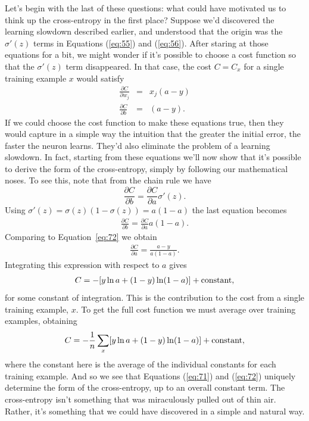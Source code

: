 \documentclass[a4paper,twoside,10pt]{book}
\begin{document}
Let's begin with the last of these questions: what could have motivated us to think up the cross-entropy in the first place? Suppose we'd discovered the learning slowdown described earlier, and understood that the origin was the $\sigma'(z)$ terms in Equations (\ref{eq:55}) and (\ref{eq:56}). After staring at those equations for a bit, we might wonder if it's possible to choose a cost function so that the $\sigma'(z)$ term disappeared. In that case, the cost $C=C_x$ for a single training example $x$ would satisfy
\begin{eqnarray} 
\frac{\partial C}{\partial w_j} & = & x_j(a-y) \label{eq:71}\\
\frac{\partial C}{\partial b } & = & (a-y).
\label{eq:72}\end{eqnarray}
If we could choose the cost function to make these equations true, then they would capture in a simple way the intuition that the greater the initial error, the faster the neuron learns. They'd also eliminate the problem of a learning slowdown. In fact, starting from these equations we'll now show that it's possible to derive the form of the cross-entropy, simply by following our mathematical noses. To see this, note that from the chain rule we have
\begin{equation}
	\frac{\partial C}{\partial b} = \frac{\partial C}{\partial a} \sigma'(z).
	\label{eq:73}
\end{equation}
Using $\sigma'(z)=\sigma(z)(1-\sigma(z))=a(1-a)$ the last equation becomes
\begin{eqnarray}
\frac{\partial C}{\partial b} = \frac{\partial C}{\partial a} 
a(1-a).
\label{eq:74}\end{eqnarray}
Comparing to Equation~\ref{eq:72} we obtain
\begin{eqnarray}
\frac{\partial C}{\partial a} = \frac{a-y}{a(1-a)}. \label{eq:75}\end{eqnarray}
Integrating this expression with respect to $a$ gives
\begin{eqnarray}
C = -[y \ln a + (1-y) \ln (1-a)]+ {\rm constant},
\label{eq:76}\end{eqnarray}
for some constant of integration. This is the contribution to the cost from a single training example, $x$. To get the full cost function we must average over training examples, obtaining
\begin{eqnarray}
C = -\frac{1}{n} \sum_x [y \ln a +(1-y) \ln(1-a)] + {\rm constant},
\label{eq:77}\end{eqnarray}
where the constant here is the average of the individual constants for each training example. And so we see that Equations (\ref{eq:71}) and (\ref{eq:72}) uniquely determine the form of the cross-entropy, up to an overall constant term. The cross-entropy isn't something that was miraculously pulled out of thin air. Rather, it's something that we could have discovered in a simple and natural way.
\end{document}
